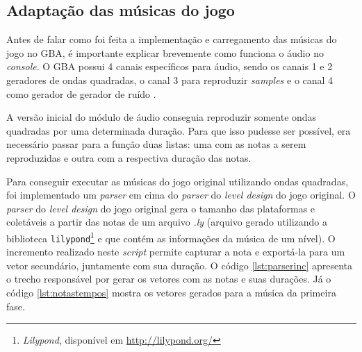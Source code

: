 \subsection{Adaptação das músicas do jogo} \label{adapmusic}

Antes de falar como foi feita a implementação e carregamento das músicas do jogo no GBA, é importante explicar brevemente como funciona o áudio no \textit{console}. O GBA possui 4 canais específicos para áudio, sendo os canais 1 e 2 geradores de ondas quadradas, o canal 3 para reproduzir \textit{samples} e o canal 4 como gerador de gerador de ruído \cite{tonc}.

A versão inicial do módulo de áudio conseguia reproduzir somente ondas quadradas por uma determinada duração. Para que isso pudesse ser possível, era necessário passar para a função duas listas: uma com as notas a serem reproduzidas e outra com a respectiva duração das notas.

Para conseguir executar as músicas do jogo original utilizando ondas quadradas, foi implementado um \textit{parser} em cima do \textit{parser} do \textit{level design} do jogo original. O \textit{parser} do \textit{level design} do jogo original gera o tamanho das plataformas e coletáveis a partir das notas de um arquivo \textit{.ly} (arquivo gerado utilizando a biblioteca \texttt{lilypond}\footnote{\textit{Lilypond}, disponível em \url{http://lilypond.org/}} e que contém as informações da música de um nível). O incremento realizado neste \textit{script} permite capturar a nota e exportá-la para um vetor secundário, juntamente com sua duração. O código \ref{lst:parserinc} apresenta o trecho responsável por gerar os vetores com as notas e suas durações. Já o código \ref{lst:notastempos} mostra os vetores gerados para a música da primeira fase.

